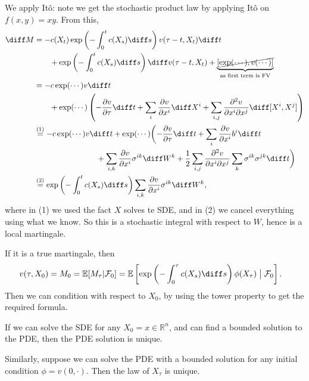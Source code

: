 \documentclass[12pt]{article}
\begin{document}
\begin{proofbox}
	We apply It\^o: note we get the stochastic product law by applying It\^o on $f(x, y) = xy$. From this,
	\begin{align*}
		\diff M &= - c(X_t) \exp \left( - \int_0^{t} c(X_s) \diff s \right) v(\tau - t, X_t) \diff t \\
			& \qquad + \exp \left( - \int_0^{t} c(X_s) \diff s \right) \diff v(\tau - t, X_t) + \underbrace{\cancel{[ \exp(\cdots), v(\cdots) ]}}_{\text{as first term is FV}} \\
			&= - c \exp (\cdots) v \diff t \\
			& \qquad + \exp( \cdots) \left( - \frac{\partial v}{\partial \tau} \diff t + \sum_i \frac{\partial v}{\partial x^{i}} \diff X^{i} + \sum_{i, j} \frac{\partial^2 v}{\partial x^{i} \partial x^{j}} \diff [X^{i}, X^{j}] \right) \\
			&\overset{(1)}= - c \exp(\cdots) v \diff t + \exp(\cdots) \biggl( - \frac{\partial v}{\partial \tau} \diff t + \sum_{i} \frac{\partial v}{\partial x^{i}} b^i \diff t \\
			& \qquad \qquad \qquad \qquad + \sum_{i, k} \frac{\partial v}{\partial x^{i}} \sigma^{ik} \diff W^k + \frac 12 \sum_{i, j} \frac{\partial^2 v}{\partial x^{i} \partial x^{j}} \sum_k \sigma^{ik} \sigma^{jk} \diff t \biggr)\\
			&\overset{(2)}= \exp \left( - \int_0^{t} c(X_s) \diff s \right) \sum_{i, k} \frac{\partial v}{\partial x^{i}} \sigma^{ik} \diff W^{k},
	\end{align*}
	where in (1) we used the fact $X$ solves te SDE, and in (2) we cancel everything using what we know. So this is a stochastic integral with respect to $W$, hence is a local martingale.

	If it is a true martingale, then
	\begin{align*}
		v(\tau, X_0) &= M_0 = \mathbb{E}[M_\tau | \mathcal{F}_0] = \mathbb{E}\left[ \exp \left(- \int_0^{\tau} c(X_s) \diff s \right) \phi(X_\tau) \bigm| \mathcal{F}_0 \right].
	\end{align*}
	Then we can condition with respect to $X_0$, by using the tower property to get the required formula.
\end{proofbox}

\begin{remark}
	If we can solve the SDE for any $X_0 = x \in \mathbb{R}^{n}$, and can find a bounded solution to the PDE, then the PDE solution is unique.

	Similarly, suppose we can solve the PDE with a bounded solution for any initial condition $\phi = v(0, \cdot)$. Then the law of $X_\tau$ is unique.
\end{remark}
\end{document}
